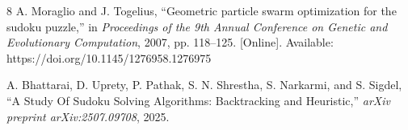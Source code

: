 \documentclass[runningheads]{llncs}
\begin{document}
\begin{thebibliography}{8}
    A. Moraglio and J. Togelius, ``Geometric particle swarm optimization for the sudoku puzzle,'' in \emph{Proceedings of the 9th Annual Conference on Genetic and Evolutionary Computation}, 2007, pp. 118--125. [Online]. Available: https://doi.org/10.1145/1276958.1276975

    A. Bhattarai, D. Uprety, P. Pathak, S. N. Shrestha, S. Narkarmi, and S. Sigdel, ``A Study Of Sudoku Solving Algorithms: Backtracking and Heuristic,'' \emph{arXiv preprint arXiv:2507.09708}, 2025.


\end{thebibliography}
\end{document}
